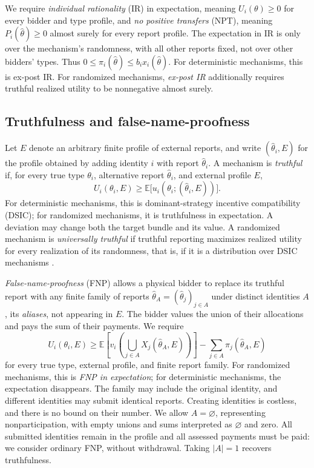 \documentclass[format=acmsmall, review=false]{acmart}
\theoremstyle{acmdefinition}%
\begin{document}
We require \emph{individual rationality} (IR) in expectation,
meaning $U_i(\theta)\ge0$ for every bidder and type profile, and
\emph{no positive transfers} (NPT), meaning
$P_i(\hat\theta)\ge0$ almost surely for every report profile.
The expectation in IR is only over the mechanism's randomness,
with all other reports fixed, not over other bidders' types.
Thus $0\le\pi_i(\hat\theta)\le b_i x_i(\hat\theta)$.
For deterministic mechanisms, this is ex-post IR. For randomized
mechanisms, \emph{ex-post IR} additionally requires truthful
realized utility to be nonnegative almost surely.

\subsection{Truthfulness and false-name-proofness}

Let $E$ denote an arbitrary finite profile of external reports,
and write $(\hat\theta_i,E)$ for the profile obtained by adding
identity $i$ with report $\hat\theta_i$. A mechanism is
\emph{truthful} if, for every true type $\theta_i$, alternative
report $\hat\theta_i$, and external profile $E$,
\[
U_i(\theta_i,E)
\ge
\mathbb{E}\bigl[u_i(\theta_i;(\hat\theta_i,E))\bigr].
\]
For deterministic mechanisms, this is dominant-strategy
incentive compatibility (DSIC); for randomized mechanisms, it is
truthfulness in expectation. A deviation may change both the
target bundle and its value. A randomized mechanism is
\emph{universally truthful} if truthful reporting maximizes
realized utility for every realization of its randomness, that
is, if it is a distribution over DSIC mechanisms
\citep{dobzinski2006truthful}.

\emph{False-name-proofness} (FNP) \citep{yokoo2004effect} allows a
physical bidder to
replace its truthful report with any finite family of reports
$\hat\theta_A=(\hat\theta_j)_{j\in A}$ under distinct identities
$A$, its \emph{aliases}, not appearing in
$E$. The bidder values the union of their allocations and pays
the sum of their payments. We require
\[
U_i(\theta_i,E)
\ge
\mathbb{E}\!\left[
  v_i\!\left(\bigcup_{j\in A}X_j(\hat\theta_A,E)\right)
\right]
-\sum_{j\in A}\pi_j(\hat\theta_A,E)
\]
for every true type, external profile, and finite report family.
For randomized mechanisms, this is \emph{FNP in expectation};
for deterministic mechanisms, the expectation disappears.
The family may include the original identity, and different
identities may submit identical reports. Creating identities
is costless, and there is no bound on their number. We allow
$A=\varnothing$, representing nonparticipation, with empty unions
and sums interpreted as $\varnothing$ and zero. All submitted
identities remain in the profile and all assessed payments must
be paid: we consider ordinary FNP, without withdrawal. Taking
$|A|=1$ recovers truthfulness.
\end{document}
